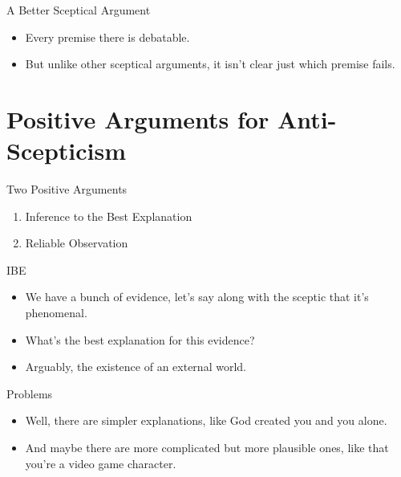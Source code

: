 \documentclass[
  17pt,
  letterpaper,
  ignorenonframetext,
  aspectratio=169,
]{beamer}
\providecommand{\tightlist}{%
  \setlength{\itemsep}{0pt}\setlength{\parskip}{0pt}}\usepackage{longtable,booktabs,array}
\begin{document}
\begin{frame}{A Better Sceptical Argument}
\protect\hypertarget{a-better-sceptical-argument-1}{}
\begin{itemize}[<+->]
\tightlist
\item
  Every premise there is debatable.
\item
  But unlike other sceptical arguments, it isn't clear just which
  premise fails.
\end{itemize}
\end{frame}

\hypertarget{positive-arguments-for-anti-scepticism}{%
\section{Positive Arguments for
Anti-Scepticism}\label{positive-arguments-for-anti-scepticism}}

\begin{frame}{Two Positive Arguments}
\protect\hypertarget{two-positive-arguments}{}
\begin{enumerate}[<+->]
\tightlist
\item
  Inference to the Best Explanation
\item
  Reliable Observation
\end{enumerate}
\end{frame}

\begin{frame}{IBE}
\protect\hypertarget{ibe}{}
\begin{itemize}[<+->]
\tightlist
\item
  We have a bunch of evidence, let's say along with the sceptic that
  it's phenomenal.
\item
  What's the best explanation for this evidence?
\item
  Arguably, the existence of an external world.
\end{itemize}
\end{frame}

\begin{frame}{Problems}
\protect\hypertarget{problems}{}
\begin{itemize}[<+->]
\tightlist
\item
  Well, there are simpler explanations, like God created you and you
  alone.
\item
  And maybe there are more complicated but more plausible ones, like
  that you're a video game character.
\end{itemize}
\end{frame}
\end{document}
